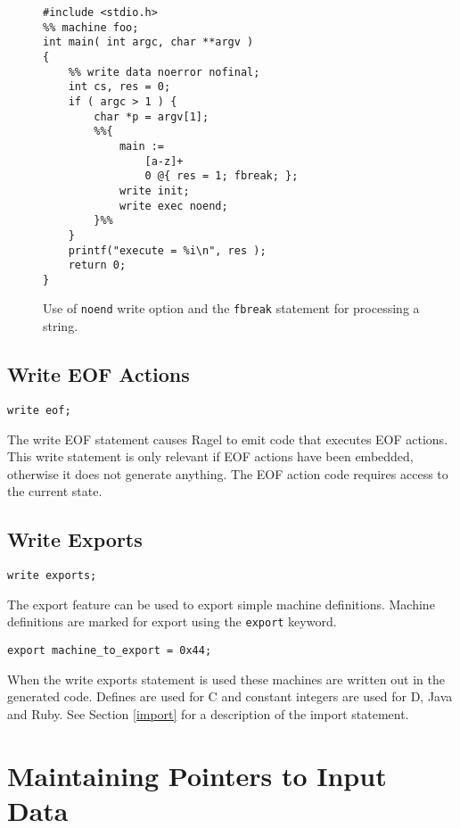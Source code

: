 \documentclass[letterpaper,11pt,oneside]{book}
\newcommand{\verbspace}{\vspace{10pt}}
\begin{document}
\begin{figure}
\small
\begin{verbatim}
#include <stdio.h>
%% machine foo;
int main( int argc, char **argv )
{
    %% write data noerror nofinal;
    int cs, res = 0;
    if ( argc > 1 ) {
        char *p = argv[1];
        %%{ 
            main := 
                [a-z]+ 
                0 @{ res = 1; fbreak; };
            write init;
            write exec noend;
        }%%
    }
    printf("execute = %i\n", res );
    return 0;
}
\end{verbatim}
\caption{Use of {\tt noend} write option and the {\tt fbreak} statement for
processing a string.}
\label{fbreak-example}
\end{figure}


\subsection{Write EOF Actions}
\begin{verbatim}
write eof;
\end{verbatim}
\verbspace

The write EOF statement causes Ragel to emit code that executes EOF actions.
This write statement is only relevant if EOF actions have been embedded,
otherwise it does not generate anything. The EOF action code requires access to
the current state.

\subsection{Write Exports}
\label{export}

\begin{verbatim}
write exports;
\end{verbatim}
\verbspace

The export feature can be used to export simple machine definitions. Machine definitions
are marked for export using the \verb|export| keyword.

\verbspace
\begin{verbatim}
export machine_to_export = 0x44;
\end{verbatim}
\verbspace

When the write exports statement is used these machines are 
written out in the generated code. Defines are used for C and constant integers
are used for D, Java and Ruby. See Section \ref{import} for a description of the
import statement.
  
\section{Maintaining Pointers to Input Data}
\end{document}
